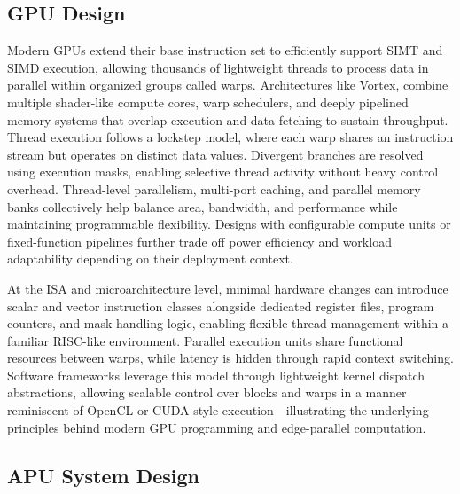 \documentclass[a4paper,twoside]{article}
\begin{document}
\subsection{GPU Design}

Modern GPUs extend their base instruction set to efficiently support SIMT and SIMD execution, allowing thousands of lightweight threads to process data in parallel within organized groups called warps. Architectures like Vortex, combine multiple shader-like compute cores, warp schedulers, and deeply pipelined memory systems that overlap execution and data fetching to sustain throughput. Thread execution follows a lockstep model, where each warp shares an instruction stream but operates on distinct data values. Divergent branches are resolved using execution masks, enabling selective thread activity without heavy control overhead. Thread-level parallelism, multi-port caching, and parallel memory banks collectively help balance area, bandwidth, and performance while maintaining programmable flexibility. Designs with configurable compute units or fixed-function pipelines further trade off power efficiency and workload adaptability depending on their deployment context.  

At the ISA and microarchitecture level, minimal hardware changes can introduce scalar and vector instruction classes alongside dedicated register files, program counters, and mask handling logic, enabling flexible thread management within a familiar RISC-like environment. Parallel execution units share functional resources between warps, while latency is hidden through rapid context switching. Software frameworks leverage this model through lightweight kernel dispatch abstractions, allowing scalable control over blocks and warps in a manner reminiscent of OpenCL or CUDA-style execution—illustrating the underlying principles behind modern GPU programming and edge-parallel computation.

\subsection{APU System Design}
\end{document}
